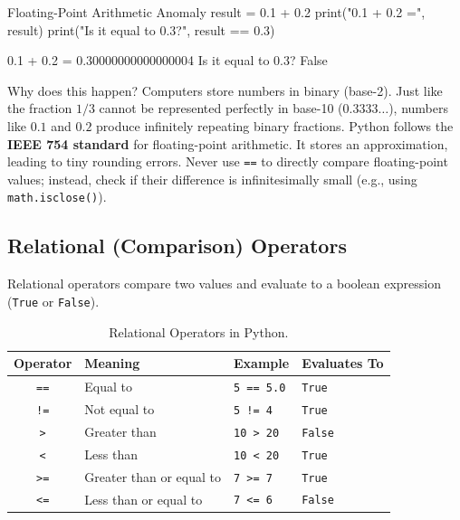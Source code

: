 \begin{pythoncode}{Floating-Point Arithmetic Anomaly}
result = 0.1 + 0.2
print("0.1 + 0.2 =", result)
print("Is it equal to 0.3?", result == 0.3)
\end{pythoncode}

\begin{outputbox}
0.1 + 0.2 = 0.30000000000000004
Is it equal to 0.3? False
\end{outputbox}

Why does this happen? Computers store numbers in binary (base-2). Just like the fraction $1/3$ cannot be represented perfectly in base-10 ($0.3333\dots$), numbers like $0.1$ and $0.2$ produce infinitely repeating binary fractions. Python follows the \textbf{IEEE 754 standard} for floating-point arithmetic. It stores an approximation, leading to tiny rounding errors. Never use \texttt{==} to directly compare floating-point values; instead, check if their difference is infinitesimally small (e.g., using \texttt{math.isclose()}).

\subsection{Relational (Comparison) Operators}

Relational operators compare two values and evaluate to a boolean expression (\texttt{True} or \texttt{False}).

\begin{table}[htbp]
\centering
\small
\renewcommand{\arraystretch}{1.2}
\begin{tabularx}{\linewidth}{cXlX}
\toprule
\textbf{Operator} & \textbf{Meaning} & \textbf{Example} & \textbf{Evaluates To} \\
\midrule
\texttt{==} & Equal to & \texttt{5 == 5.0} & \texttt{True} \\
\texttt{!=} & Not equal to & \texttt{5 != 4} & \texttt{True} \\
\texttt{>} & Greater than & \texttt{10 > 20} & \texttt{False} \\
\texttt{<} & Less than & \texttt{10 < 20} & \texttt{True} \\
\texttt{>=} & Greater than or equal to & \texttt{7 >= 7} & \texttt{True} \\
\texttt{<=} & Less than or equal to & \texttt{7 <= 6} & \texttt{False} \\
\bottomrule
\end{tabularx}
\caption{Relational Operators in Python.}
\end{table}

